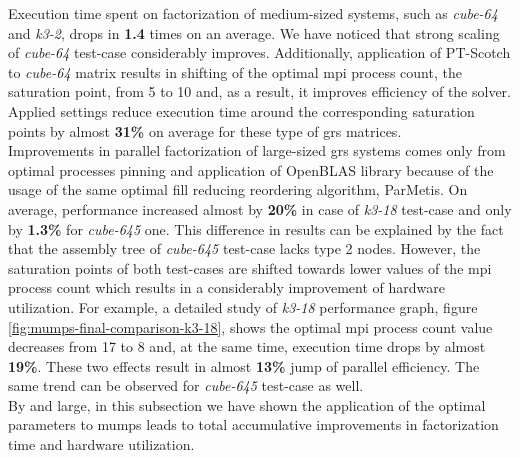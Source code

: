 Execution time spent on factorization of medium-sized systems, such as \textit{cube-64} and \textit{k3-2}, drops in \textbf{1.4} times on an average. We have noticed that strong scaling of \textit{cube-64} test-case considerably improves. Additionally, application of PT-Scotch to \textit{cube-64} matrix results in shifting of the optimal \acrshort{mpi} process count, the saturation point, from 5 to 10 and, as a result, it improves efficiency of the solver. Applied settings reduce execution time around the corresponding saturation points by almost \textbf{31\%} on average for these type of \acrshort{grs} matrices.\\



Improvements in parallel factorization of large-sized \acrshort{grs} systems comes only from optimal processes pinning and application of OpenBLAS library because of the usage of the same optimal fill reducing reordering algorithm, ParMetis. On average, performance increased almost by \textbf{20\%} in case of \textit{k3-18} test-case and only by \textbf{1.3\%} for \textit{cube-645} one. This difference in results can be explained by the fact that the assembly tree of \textit{cube-645} test-case lacks type 2 nodes. However, the saturation points of both test-cases are shifted towards lower values of the \acrshort{mpi} process count which results in a considerably improvement of hardware utilization. For example, a detailed study of \textit{k3-18} performance graph, figure \ref{fig:mumps-final-comparison-k3-18}, shows the optimal \acrshort{mpi} process count value decreases from 17 to 8 and, at the same time, execution time drops by almost \textbf{19\%}. These two effects result in almost \textbf{13\%} jump of parallel efficiency. The same trend can be observed for \textit{cube-645} test-case as well.\\


By and large, in this subsection we have shown the application of the optimal parameters to \acrshort{mumps} leads to total accumulative improvements in factorization time and hardware utilization.\\



